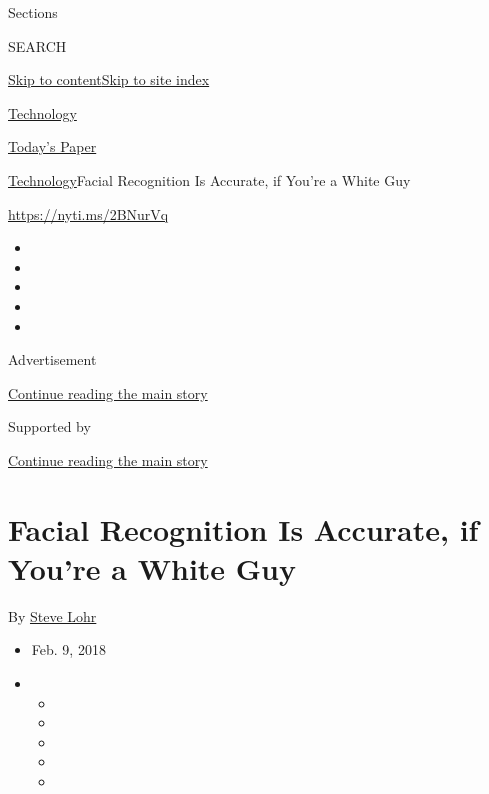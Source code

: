 Sections

SEARCH

\protect\hyperlink{site-content}{Skip to
content}\protect\hyperlink{site-index}{Skip to site index}

\href{https://www.nytimes3xbfgragh.onion/section/technology}{Technology}

\href{https://myaccount.nytimes3xbfgragh.onion/auth/login?response_type=cookie\&client_id=vi}{}

\href{https://www.nytimes3xbfgragh.onion/section/todayspaper}{Today's
Paper}

\href{/section/technology}{Technology}\textbar{}Facial Recognition Is
Accurate, if You're a White Guy

\url{https://nyti.ms/2BNurVq}

\begin{itemize}
\item
\item
\item
\item
\item
\end{itemize}

Advertisement

\protect\hyperlink{after-top}{Continue reading the main story}

Supported by

\protect\hyperlink{after-sponsor}{Continue reading the main story}

\hypertarget{facial-recognition-is-accurate-if-youre-a-white-guy}{%
\section{Facial Recognition Is Accurate, if You're a White
Guy}\label{facial-recognition-is-accurate-if-youre-a-white-guy}}

By \href{http://www.nytimes3xbfgragh.onion/by/steve-lohr}{Steve Lohr}

\begin{itemize}
\item
  Feb. 9, 2018
\item
  \begin{itemize}
  \item
  \item
  \item
  \item
  \item
  \end{itemize}
\end{itemize}

